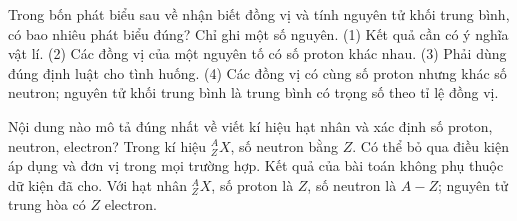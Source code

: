 \begin{ex}
Trong bốn phát biểu sau về nhận biết đồng vị và tính nguyên tử khối trung bình, có bao nhiêu phát biểu đúng? Chỉ ghi một số nguyên. (1) Kết quả cần có ý nghĩa vật lí. (2) Các đồng vị của một nguyên tố có số proton khác nhau. (3) Phải dùng đúng định luật cho tình huống. (4) Các đồng vị có cùng số proton nhưng khác số neutron; nguyên tử khối trung bình là trung bình có trọng số theo tỉ lệ đồng vị.
\end{ex}

\begin{ex}
Nội dung nào mô tả đúng nhất về viết kí hiệu hạt nhân và xác định số proton, neutron, electron?
\choice
{Trong kí hiệu $^{A}_{Z}X$, số neutron bằng $Z$.}
{Có thể bỏ qua điều kiện áp dụng và đơn vị trong mọi trường hợp.}
{Kết quả của bài toán không phụ thuộc dữ kiện đã cho.}
{\True Với hạt nhân $^{A}_{Z}X$, số proton là $Z$, số neutron là $A-Z$; nguyên tử trung hòa có $Z$ electron.}
\end{ex}


